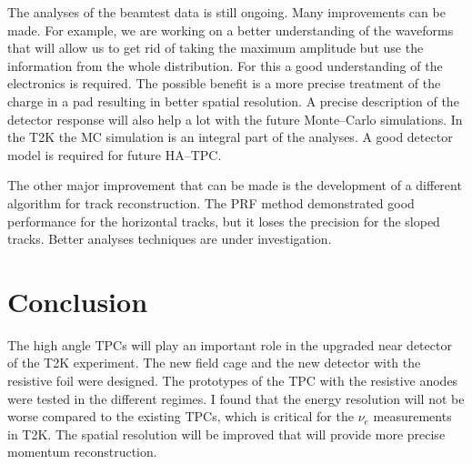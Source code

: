 \documentclass[../main.tex]{subfiles}
\begin{document}
The analyses of the beamtest data is still ongoing. Many improvements can be made. For example, we are working on a better understanding of the waveforms that will allow us to get rid of taking the maximum amplitude but use the information from the whole distribution. For this a good understanding of the electronics is required. The possible benefit is a more precise treatment of the charge in a pad resulting in better spatial resolution. A precise description of the detector response will also help a lot with the future Monte--Carlo simulations. In the T2K the MC simulation is an integral part of the analyses. A good detector model is required for future HA--TPC.

The other major improvement that can be made is the development of a different algorithm for track reconstruction. The PRF method demonstrated good performance for the horizontal tracks, but it loses the precision for the sloped tracks. Better analyses techniques are under investigation.

\section{Conclusion}
The high angle TPCs will play an important role in the upgraded near detector of the T2K experiment. The new field cage and the new detector with the resistive foil were designed. The prototypes of the TPC with the resistive anodes were tested in the different regimes. I found that the energy resolution will not be worse compared to the existing TPCs, which is critical for the $\nu_e$ measurements in T2K. The spatial resolution will be improved that will provide more precise momentum reconstruction.
\end{document}
